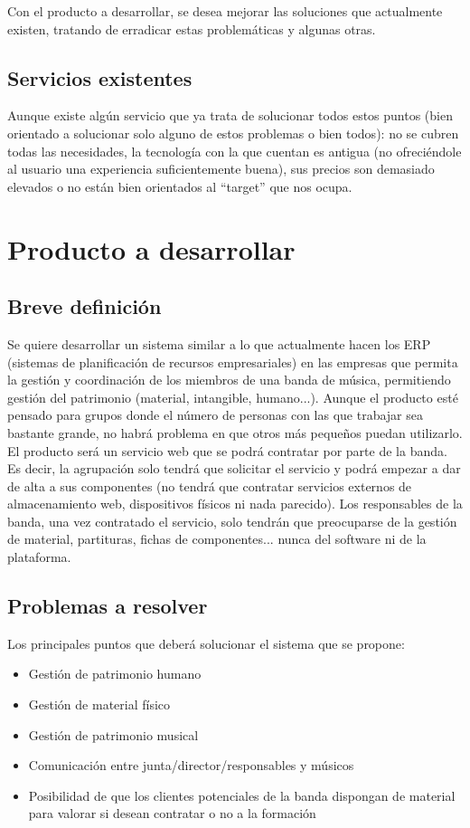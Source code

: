 \documentclass[11pt,spanish]{article}
\begin{document}
Con el producto a desarrollar, se desea mejorar las soluciones que actualmente existen,
tratando de erradicar estas problemáticas y algunas otras.

\subsection{Servicios existentes}
Aunque existe algún servicio que ya trata de solucionar todos estos puntos (bien orientado a
solucionar solo alguno de estos problemas o bien todos): no se cubren todas las necesidades,
la tecnología con la que cuentan es antigua (no ofreciéndole al usuario una experiencia suficientemente buena),
sus precios son demasiado elevados o no están bien orientados al “target” que nos ocupa.



\section{Producto a desarrollar}

\subsection{Breve definición}
Se quiere desarrollar un sistema similar a lo que actualmente hacen los ERP (sistemas de planificación de recursos empresariales)
en las empresas que permita la gestión y
coordinación de los miembros de una banda de música, permitiendo
gestión del patrimonio (material, intangible, humano...).
\newline
Aunque el producto esté pensado para grupos donde el número de personas con las
que trabajar sea bastante grande, no habrá
problema en que otros más pequeños puedan utilizarlo.
\newline
El producto será un servicio web que se podrá contratar por parte de la banda.
Es decir, la agrupación solo tendrá que solicitar el servicio y podrá empezar a dar
de alta a sus componentes (no tendrá que contratar servicios externos de almacenamiento web,
dispositivos físicos ni nada parecido). Los responsables de la banda, una vez
contratado el servicio, solo tendrán que preocuparse de la gestión de material, partituras,
fichas de componentes... nunca del software ni de la plataforma.


\subsection{Problemas a resolver}
Los principales puntos que deberá solucionar el sistema que se propone:
\begin{itemize}
  \item Gestión de patrimonio humano
  \item Gestión de material físico
  \item Gestión de patrimonio musical
  \item Comunicación entre junta/director/responsables y músicos
  \item Posibilidad de que los clientes potenciales de la banda dispongan de
  material para valorar si desean contratar o no a la formación
\end{itemize}
\end{document}

